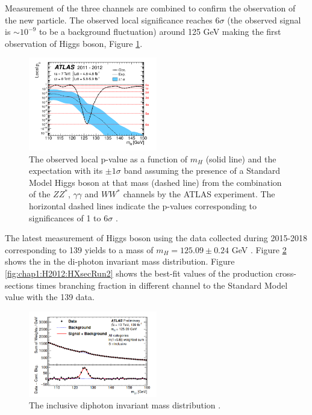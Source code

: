 Measurement of the three channels are combined to confirm the observation of the new particle. The observed local significance reaches $6\sigma$ (the observed signal is $\sim10^{-9}$ to be a background fluctuation) around 125 GeV making the first observation of Higgs boson, Figure \ref{fig:chap1:H2012:P0}.  
\begin{figure}[H]
    \centering
    \includegraphics[width=0.5\textwidth]{Ch1/Img/Hp0.png}
    \caption{The observed local p-value as a function of $m_H$ (solid line) and the expectation with its $\pm1\sigma$ band assuming the presence of a Standard Model Higgs boson at that mass (dashed line) from the combination of the $ZZ^*$, $\gamma\gamma$ and $WW^*$ channels by the ATLAS experiment. The horizontal dashed lines indicate the p-values corresponding to significances of 1 to 6$\sigma$ \cite{ATLAS_2012}.}
    \label{fig:chap1:H2012:P0}
\end{figure}
The latest measurement of Higgs boson using the data collected during 2015-2018 corresponding to 139 \ifb yields to a  mass of $m_{H}=125.09\pm0.24 $ GeV \cite{Mass}. Figure \ref{fig:chap1:H2012:MyyRun2} shows the in the di-photon invariant mass distribution. Figure \ref{fig:chap1:H2012:HXsecRun2} shows the best-fit values of the production cross-sections times branching fraction in different channel to the Standard Model value with the 139 \ifb data.\\
\begin{figure}[H]
    \centering
    \includegraphics[width=0.5\textwidth]{Ch1/Img/myy_run2.png}
    \caption{The inclusive diphoton invariant mass distribution \cite{ATLAS_2020}.}
    \label{fig:chap1:H2012:MyyRun2}
\end{figure}
